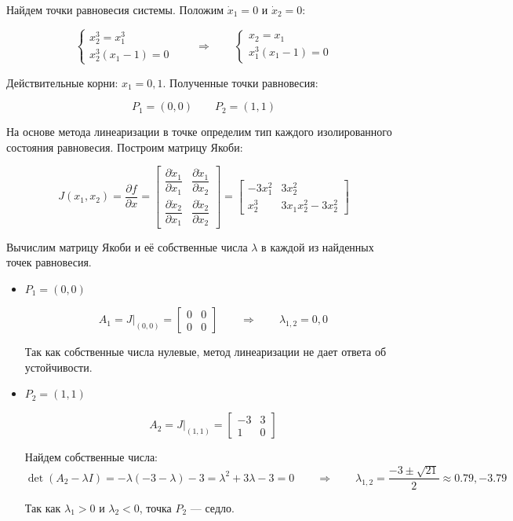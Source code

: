 \documentclass[a4paper,12pt]{article}
\begin{document}
Найдем точки равновесия системы. Положим \(\dot{x}_1 = 0 \text{ и } \dot{x}_2 = 0\):

\[
\begin{cases}
	x_2^3 = x_1^3 \\
	x_2^3(x_1 - 1) = 0
\end{cases} 
\qquad \Longrightarrow \qquad
\begin{cases}
	x_2 = x_1 \\
	x_1^3(x_1 - 1) = 0
\end{cases}
\]

Действительные корни: \(x_1 = 0, 1\). Полученные точки равновесия:

\[
P_1 = (0, 0) \qquad P_2 = (1, 1)
\]

На основе метода линеаризации в точке определим тип каждого изолированного состояния равновесия. Построим матрицу Якоби:

\[
J(x_1, x_2) = \frac{\partial f}{\partial x} = 
\begin{bmatrix}
	\dfrac{\partial \dot{x}_1}{\partial x_1} & \dfrac{\partial \dot{x}_1}{\partial x_2} \\[10pt]
	\dfrac{\partial \dot{x}_2}{\partial x_1} & \dfrac{\partial \dot{x}_2}{\partial x_2}
\end{bmatrix} = 
\begin{bmatrix}
	-3x_1^2 & 3x_2^2 \\
	x_2^3 & 3x_1 x_2^2 - 3x_2^2
\end{bmatrix}
\]

Вычислим матрицу Якоби и её собственные числа $\lambda$ в каждой из найденных точек равновесия.

\begin{itemize}
	\item \(P_1 = (0, 0)\)
	
	\[
	A_1 = J|_{(0,0)} = \begin{bmatrix} 0 & 0 \\ 0 & 0 \end{bmatrix}
	\qquad \Longrightarrow \qquad
	\lambda_{1,2} = 0, 0
	\]
	
	Так как собственные числа нулевые, метод линеаризации не дает ответа об устойчивости.
	
	\item \(P_2 = (1, 1)\)
	
	\[
	A_2 = J|_{(1,1)} = \begin{bmatrix} -3 & 3 \\ 1 & 0 \end{bmatrix}
	\]
	
	Найдем собственные числа:
	\[
	\det(A_2 - \lambda I) = -\lambda(-3-\lambda) - 3 = \lambda^2 + 3\lambda - 3 = 0
	\qquad \Longrightarrow \qquad
	\lambda_{1,2} = \frac{-3 \pm \sqrt{21}}{2} \approx 0.79, -3.79
	\]
	
	Так как $\lambda_1 > 0$ и $\lambda_2 < 0$, точка $P_2$ --- седло.
	
\end{itemize}
\end{document}

